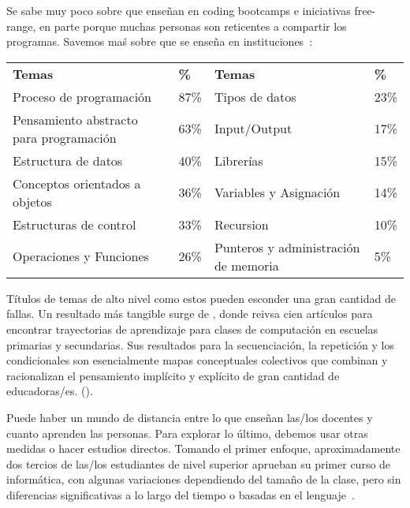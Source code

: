 
Se sabe muy poco sobre que enseñan en coding bootcamps e iniciativas free-range, en parte porque muchas personas son reticentes a compartir los programas.
Savemos maś sobre que se enseña en instituciones~\cite{Luxt2017}:

\begin{longtable}{llll}
\textbf{Temas}			& \textbf{\%}	& \textbf{Temas}		& \textbf{\%} \\
Proceso de programación     	& 87\%		& Tipos de datos                & 23\% \\
Pensamiento abstracto para programación	& 63\%		& Input/Output                  & 17\% \\
Estructura de datos      		& 40\%		& Librerías                     & 15\% \\
Conceptos orientados a objetos        & 36\%		& Variables y Asignación       & 14\% \\
Estructuras de control              & 33\%		& Recursion 			& 10\% \\
Operaciones y Funciones         & 26\%		& Punteros y administración de memoria	&  5\%
\end{longtable}

Títulos de temas de alto nivel como estos pueden esconder una gran cantidad de fallas.
Un resultado más tangible surge de \cite{Rich2017},
donde reivsa cien artículos para encontrar trayectorias de aprendizaje para clases de computación en escuelas primarias y secundarias.
Sus resultados para la secuenciación, la repetición y los condicionales son esencialmente mapas conceptuales colectivos
que combinan y racionalizan el pensamiento implícito y explícito de gran cantidad de educadoras/es.
().

\newpage



Puede haber un mundo de distancia entre lo que enseñan las/los docentes y cuanto aprenden las personas.
Para explorar lo último, debemos usar otras medidas o hacer estudios directos.
Tomando el primer enfoque, aproximadamente dos tercios de las/los estudiantes de nivel superior aprueban su primer curso de informática,
con algunas variaciones dependiendo del tamaño de la clase,
pero sin diferencias significativas a lo largo del tiempo o basadas en el lenguaje~\cite{Benn2007a,Wats2014}.

